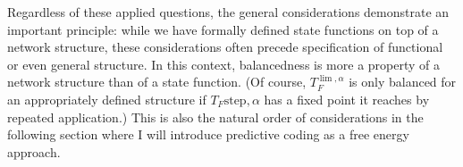 \documentclass[a4paper,11pt]{article}
\begin{document}
\begin{Abs}
Regardless of these applied questions, the general considerations demonstrate an important principle: while we have formally defined state functions on top of a network structure, these considerations often precede specification of functional or even general structure. In this context, balancedness is more a property of a network structure than of a state function. (Of course, $T_F^{\lim,\alpha}$ is only balanced for an appropriately defined structure if $T_F{\text{step},\alpha}$ has a fixed point it reaches by repeated application.) This is also the natural order of considerations in the following section where I will introduce predictive coding as a free energy approach.
\end{Abs}
\printbibliography
\end{document}
